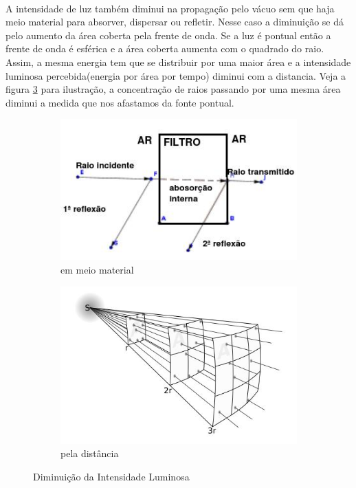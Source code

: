 \documentclass[a4paper,11pt]{article}
\begin{document}
\paragraph{}A intensidade de luz também diminui na propagação pelo vácuo sem que haja meio material para absorver, dispersar ou refletir. Nesse caso a diminuição se dá pelo aumento da área coberta pela frente de onda. Se a luz é pontual então a frente de onda é esférica e a área coberta aumenta com o quadrado do raio. Assim, a mesma energia tem que se distribuir por uma maior área e a intensidade luminosa percebida(energia por área por tempo) diminui com a distancia. Veja a figura \ref{fig:2-intro-vacuo} para ilustração, a concentração de raios passando por uma mesma área diminui a medida que nos afastamos da fonte pontual. 
\FloatBarrier
\begin{figure}[!htp]
	\begin{subfigure}[!htp]{0.3\textwidth}
		\includegraphics[scale= 0.6]{./fig:1-intro.jpeg}
		\caption{em meio material}
		\label{fig:1-intro-filtro}
	\end{subfigure}
	\hspace{2 cm}
	\begin{subfigure}[!htp]{0.3\textwidth}
		\includegraphics[scale= 0.4]{./fig:2-intro.jpeg}
		\caption{pela distância}
		\label{fig:2-intro-vacuo}
	\end{subfigure}
	\caption{Diminuição da Intensidade Luminosa}
\end{figure}
\FloatBarrier
\end{document}
